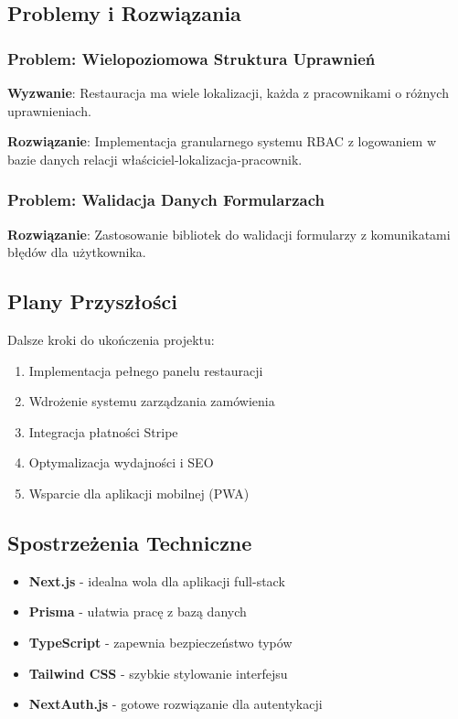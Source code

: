 \documentclass[12pt,a4paper,utf-8]{article}
\begin{document}
\subsection{Problemy i Rozwiązania}

\subsubsection{Problem: Wielopoziomowa Struktura Uprawnień}

\textbf{Wyzwanie}: Restauracja ma wiele lokalizacji, każda z pracownikami o różnych uprawnieniach.

\textbf{Rozwiązanie}: Implementacja granularnego systemu RBAC z logowaniem w bazie danych relacji właściciel-lokalizacja-pracownik.

\subsubsection{Problem: Walidacja Danych Formularzach}

\textbf{Rozwiązanie}: Zastosowanie bibliotek do walidacji formularzy z komunikatami błędów dla użytkownika.

\subsection{Plany Przyszłości}

Dalsze kroki do ukończenia projektu:

\begin{enumerate}
    \item Implementacja pełnego panelu restauracji
    \item Wdrożenie systemu zarządzania zamówienia
    \item Integracja płatności Stripe
    \item Optymalizacja wydajności i SEO
    \item Wsparcie dla aplikacji mobilnej (PWA)
\end{enumerate}

\subsection{Spostrzeżenia Techniczne}

\begin{itemize}
    \item \textbf{Next.js}  -  idealna wola dla aplikacji full-stack
    \item \textbf{Prisma}  -  ułatwia pracę z bazą danych
    \item \textbf{TypeScript}  -  zapewnia bezpieczeństwo typów
    \item \textbf{Tailwind CSS}  -  szybkie stylowanie interfejsu
    \item \textbf{NextAuth.js}  -  gotowe rozwiązanie dla autentykacji
\end{itemize}
\end{document}
